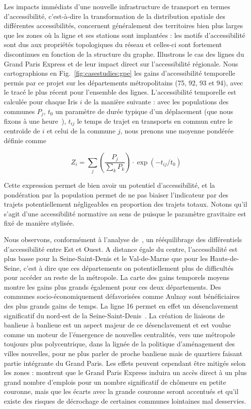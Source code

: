 Les impacts immédiats d'une nouvelle infrastructure de transport en termes d'accessibilité, c'est-à-dire la transformation de la distribution spatiale des différentes accessibilités,  concernent généralement des territoires bien plus larges que les zones où la ligne et ses stations sont implantées : les motifs d'accessibilité sont dus aux propriétés topologiques du réseau et celles-ci sont fortement discontinues en fonction de la structure du graphe. Illustrons le cas des lignes du Grand Paris Express et de leur impact direct sur l'accessibilité régionale. Nous cartographions en Fig.~\ref{fig:casestudies:gpe} les gains d'accessibilité temporelle permis par ce projet sur les départements métropolitains (75, 92, 93 et 94), avec le tracé le plus récent pour l'ensemble des lignes. L'accessibilité temporelle est calculée pour chaque Iris $i$ de la manière suivante : avec les populations des communes $P_j$, $t_0$ un paramètre de durée typique d'un déplacement (que nous fixons à une heure~\cite{zahavi1980regularities}), $t_{ij}$ le temps de trajet en transports en commun entre le centroïde de $i$ et celui de la commune $j$, nous prenons une moyenne pondérée définie comme

\[
Z_i = \sum_j \left(\frac{P_j}{\sum_k P_k}\right)\cdot \exp\left(- t_{ij}/t_0\right)
\]

Cette expression permet de bien avoir un potentiel d'accessibilité, et la pondération par la population permet de ne pas biaiser l'indicateur par des trajets potentiellement négligeables en proportion des trajets totaux. Notons qu'il s'agit d'une accessibilité normative au sens de \cite{paez2012measuring} puisque le paramètre gravitaire est fixé de manière stylisée.


Nous observons, conformément à l'analyse de~\cite{beaucire2013grand}, un rééquilibrage des différentiels d'accessibilité entre Est et Ouest. A distance égale du centre, l'accessibilité est plus basse pour la Seine-Saint-Denis et le Val-de-Marne que pour les Hauts-de-Seine, c'est à dire que ces départements on potentiellement plus de difficultés pour accéder au reste de la métropole. La carte des gains temporels moyens montre les gains plus grands également pour ces deux départements. Des communes socio-économiquement défavorisées comme Aulnay sont bénéficiaires des plus grands gains de temps. La ligne 16 permet en effet un désenclavement significatif du nord-est de la Seine-Saint-Denis~\cite{desjardins2016grand}. La création de liaisons de banlieue à banlieue est un aspect majeur de ce désenclavement et est voulue comme un moteur de l'émergence de nouvelles centralités, vers une métropole toujours plus polycentrique, dans la lignée de la politique d'aménagement des villes nouvelles, pour ne plus parler de proche banlieue mais de quartiers faisant partie intégrante du Grand Paris. Les effets peuvent cependant être mitigés selon les zones : \cite{l2013grand} montrent que le Grand Paris Express induira un accès direct à un plus grand nombre d'emplois pour un nombre significatif de chômeurs en petite couronne, mais que les écarts avec la grande couronne seront accentués et qu'il existe des risques de décrochage de certaines communes lointaines mal desservies. 


